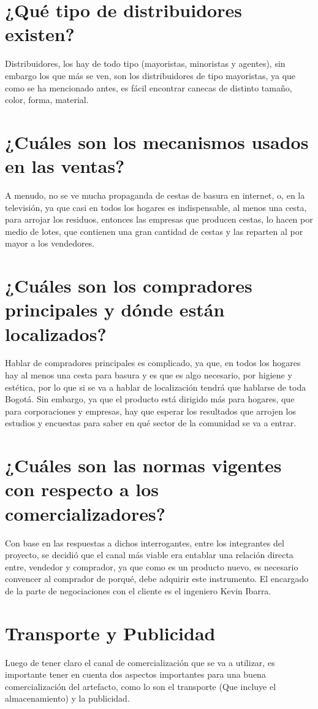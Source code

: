 \documentclass[letterpaper,12pt]{scrreprt}
\begin{document}
    \section{¿Qué tipo de distribuidores existen?}
    Distribuidores, los hay de todo tipo (mayoristas, minoristas y agentes), sin embargo los que más se ven, son los distribuidores de tipo mayoristas, ya que como se ha mencionado antes, es fácil encontrar canecas de distinto tamaño, color, forma, material.

    \section{¿Cuáles son los mecanismos usados en las ventas?}
    A menudo, no se ve mucha propaganda de cestas de basura en internet, o, en la televisión, ya que casi en todos los hogares es indispensable, al menos una cesta, para arrojar los residuos, entonces las empresas que producen cestas, lo hacen por medio de lotes, que contienen una gran cantidad de cestas y las reparten al por mayor a los vendedores.

    \section{¿Cuáles son los compradores principales y dónde están localizados?}
    Hablar de compradores principales es complicado, ya que, en todos los hogares hay al menos una cesta para basura y es que es algo necesario, por higiene y estética, por lo que si se va a hablar de localización tendrá que hablarse de toda Bogotá. Sin embargo, ya que el producto está dirigido más para hogares, que para corporaciones y empresas, hay que esperar los resultados que arrojen los estudios y encuestas para saber en qué sector de la comunidad se va a entrar.

    \section{¿Cuáles son las normas vigentes con respecto a los comercializadores?}

    Con base en las respuestas a dichos interrogantes, entre los integrantes del proyecto, se decidió que el canal más viable era entablar una relación directa entre, vendedor y comprador, ya que como es un producto nuevo, es necesario convencer al comprador de porqué, debe adquirir este instrumento. El encargado de la parte de negociaciones con el cliente es el ingeniero Kevin Ibarra.

    \section{Transporte y Publicidad}
    Luego de tener claro el canal de comercialización que se va a utilizar, es importante tener en cuenta dos aspectos importantes para una buena comercialización del artefacto, como lo son el transporte (Que incluye el almacenamiento) y la publicidad.
\end{document}
